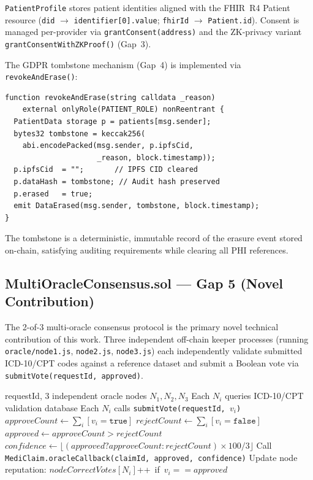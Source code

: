 \documentclass[journal]{IEEEtran}
\begin{document}
\texttt{PatientProfile} stores patient identities aligned with the FHIR~R4
Patient resource (\texttt{did} $\to$ \texttt{identifier[0].value};
\texttt{fhirId} $\to$ \texttt{Patient.id}).
Consent is managed per-provider via \texttt{grantConsent(address)} and the
ZK-privacy variant \texttt{grantConsentWithZKProof()} (Gap~3).

The GDPR tombstone mechanism (Gap~4) is implemented via \texttt{revokeAndErase()}:
\begin{lstlisting}[language=Solidity,caption=GDPR Tombstone Erasure]
function revokeAndErase(string calldata _reason)
    external onlyRole(PATIENT_ROLE) nonReentrant {
  PatientData storage p = patients[msg.sender];
  bytes32 tombstone = keccak256(
    abi.encodePacked(msg.sender, p.ipfsCid,
                     _reason, block.timestamp));
  p.ipfsCid  = "";       // IPFS CID cleared
  p.dataHash = tombstone; // Audit hash preserved
  p.erased   = true;
  emit DataErased(msg.sender, tombstone, block.timestamp);
}
\end{lstlisting}

The tombstone is a deterministic, immutable record of the erasure event stored
on-chain, satisfying auditing requirements while clearing all PHI references.

\subsection{MultiOracleConsensus.sol — Gap 5 (Novel Contribution)}

The 2-of-3 multi-oracle consensus protocol is the primary novel technical
contribution of this work. Three independent off-chain keeper processes
(running \texttt{oracle/node1.js}, \texttt{node2.js}, \texttt{node3.js})
each independently validate submitted ICD-10/CPT codes against a reference
dataset and submit a Boolean vote via \texttt{submitVote(requestId, approved)}.

\begin{algorithm}
\caption{2-of-3 Oracle Consensus}
\label{alg:oracle}
\begin{algorithmic}[1]
\REQUIRE requestId, 3 independent oracle nodes $N_1, N_2, N_3$
\STATE Each $N_i$ queries ICD-10/CPT validation database
\STATE Each $N_i$ calls \texttt{submitVote(requestId, $v_i$)}
\STATE $approveCount \leftarrow \sum_{i} [v_i = \texttt{true}]$
\STATE $rejectCount  \leftarrow \sum_{i} [v_i = \texttt{false}]$
  \STATE $approved \leftarrow approveCount > rejectCount$
  \STATE $confidence \leftarrow \lfloor(approved ? approveCount : rejectCount) \times 100 / 3\rfloor$
  \STATE Call \texttt{MediClaim.oracleCallback(claimId, approved, confidence)}
\ENDIF
\STATE Update node reputation: $nodeCorrectVotes[N_i]$++\ if\ $v_i == approved$
\end{algorithmic}
\end{algorithm}
\end{document}
